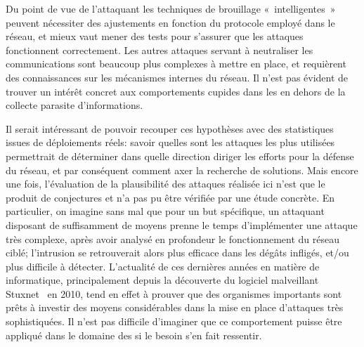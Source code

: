 Du point de vue de l'attaquant les techniques de brouillage « intelligentes » peuvent nécessiter des ajustements en fonction du protocole \mac employé dans le réseau, et mieux vaut mener des tests pour s'assurer que les attaques fonctionnent correctement.
Les autres attaques servant à neutraliser les communications sont beaucoup plus complexes à mettre en place, et requièrent des connaissances sur les mécanismes internes du réseau.
Il n'est pas évident de trouver un intérêt concret aux comportements cupides dans les \rcs en dehors de la collecte parasite d'informations.

Il serait intéressant de pouvoir recouper ces hypothèses avec des statistiques issues de déploiements réels: savoir quelles sont les attaques les plus utilisées permettrait de déterminer dans quelle direction diriger les efforts pour la défense du réseau, et par conséquent comment axer la recherche de solutions.
Mais encore une fois, l'évaluation de la plausibilité des attaques réalisée ici n'est que le produit de conjectures et n'a pas pu être vérifiée par une étude concrète.
En particulier, on imagine sans mal que pour un but spécifique, un attaquant disposant de suffisamment de moyens prenne le temps d'implémenter une attaque très complexe, après avoir analysé en profondeur le fonctionnement du réseau ciblé; l'intrusion se retrouverait alors plus efficace dans les dégâts infligés, et/ou plus difficile à détecter.
L'actualité de ces dernières années en matière de \secu informatique, principalement depuis la découverte du logiciel malveillant Stuxnet~\cite{stuxnet} en 2010, tend en effet à prouver que des organismes importants sont prêts à investir des moyens considérables dans la mise en place d'attaques très sophistiquées.
Il n'est pas difficile d'imaginer que ce comportement puisse être appliqué dans le domaine des \rcs si le besoin s'en fait ressentir.
